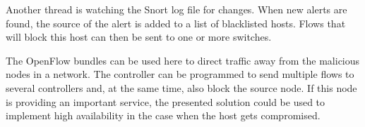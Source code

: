 Another thread is watching the Snort log file for changes. When new alerts are found, the source
of the alert is added to a list of blacklisted hosts. Flows that will block this host can then
be sent to one or more switches.

The OpenFlow bundles can be used here to direct traffic away from the malicious nodes in a network.
The controller can be programmed to send multiple flows to several controllers and, at the same time,
also block the source node. If this node is providing an important service, the presented solution could
be used to implement high availability in the case when the host gets compromised.
  